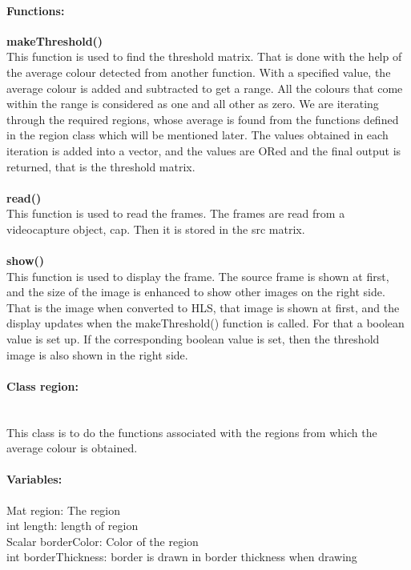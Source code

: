 \documentclass[a4paper,11pt]{article}
\newcommand{\mparagraph}[1]{\paragraph{#1}\mbox{}\\}
\begin{document}
   					    \paragraph{Functions:\\}
   					     \textbf{makeThreshold()\\}
   					     	This function is used to find the threshold matrix. That is done with the help of the average colour detected from another function. With a specified value, the average colour is added and subtracted to get a range. All the colours that come within the range is considered as one and all other as zero. We are iterating through the required regions, whose average is found from the functions defined in the region class which will be mentioned later. The values obtained in each iteration is added into a vector, and the values are ORed and the final output is returned, that is the threshold matrix.\\\\
   					     \textbf{read()\\}
   					     	This function is used to read the frames. The frames are read from a videocapture object, cap. Then it is stored in the src matrix.\\\\
   					    \textbf {show()\\}
   					      	This function is used to display the frame. The source frame is shown at first, and the size of the image is enhanced to show other images on the right side. That is the image when converted to HLS, that image is shown at first, and the display updates when the makeThreshold() function is called. For that a boolean value is set up. If the corresponding boolean value is set, then the threshold image is also shown in the right side.
   					\mparagraph{Class region:\\}

						This class is to do the functions associated with the regions from which the average colour is obtained. 

						\paragraph{Variables:\\}
						
        					Mat region:  The region\\
        					int length: length of region\\
        					Scalar borderColor: Color of the region \\
        					int borderThickness: border is drawn in  border thickness when drawing\\
\end{document}
